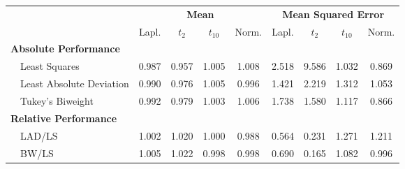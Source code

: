 %
\begin{center}
\begin{tabular}{|l||c|c|c|c||c|c|c|c|} \hline
\multicolumn{1}{|l||}{\bf }&\multicolumn{4}{c||}{\bf Mean}&\multicolumn{4}{c|}{\bf Mean Squared Error}\\ \cline{2-9}
\multicolumn{1}{|l||}{}&\multicolumn{1}{c|}{Lapl.}&\multicolumn{1}{c|}{$t_2$}&\multicolumn{1}{c|}{$t_{10}$}&\multicolumn{1}{c||}{Norm.}&\multicolumn{1}{c|}{Lapl.}&\multicolumn{1}{c|}{$t_2$}&\multicolumn{1}{c|}{$t_{10}$}&\multicolumn{1}{c|}{Norm.}\\ \hline
{\bf Absolute Performance}&&&&&&&&\\
~~Least Squares&0.987&0.957&1.005&1.008&2.518&9.586&1.032&0.869\\ 
~~Least Absolute Deviation&0.990&0.976&1.005&0.996&1.421&2.219&1.312&1.053\\ 
~~Tukey's Biweight&0.992&0.979&1.003&1.006&1.738&1.580&1.117&0.866\\ \hline
{\bf Relative Performance}&&&&&&&&\\
~~LAD/LS&1.002&1.020&1.000&0.988&0.564&0.231&1.271&1.211\\ 
~~BW/LS&1.005&1.022&0.998&0.998&0.690&0.165&1.082&0.996\\ 
\hline
\end{tabular}
\end{center}
